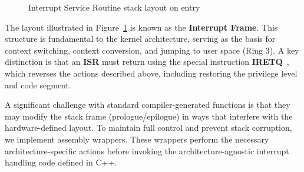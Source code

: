\documentclass[a4paper,10pt,twoside]{report}
\theoremstyle{definition}
\begin{document}
\begin{figure}[htbp]
  \centering
  \caption{Interrupt Service Routine stack layout on entry}
  \label{fig:stackframe}
\end{figure}

The layout illustrated in Figure~\ref{fig:stackframe} is known as the \textbf{Interrupt Frame}. This structure is fundamental to the kernel architecture, serving as the basis for context switching, context conversion, and jumping to user space (Ring 3). A key distinction is that an \textbf{ISR} must return using the special instruction \textbf{IRETQ}~\cite{IntelManual-Interrupts}, which reverses the actions described above, including restoring the privilege level and code segment. 

A significant challenge with standard compiler-generated functions is that they may modify the stack frame (prologue/epilogue) in ways that interfere with the hardware-defined layout. To maintain full control and prevent stack corruption, we implement assembly wrappers. These wrappers perform the necessary architecture-specific actions before invoking the architecture-agnostic interrupt handling code defined in C++.
\end{document}
